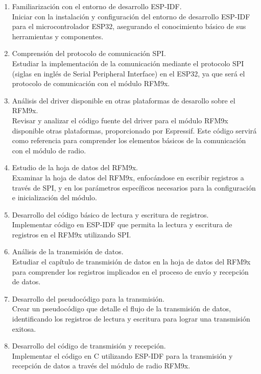 \begin{enumerate}
    \item Familiarización con el entorno de desarrollo ESP-IDF. \\
    Iniciar con la instalación y configuración del entorno de desarrollo ESP-IDF para el microcontrolador ESP32, asegurando el conocimiento básico de sus herramientas y componentes.
    \item Comprensión del protocolo de comunicación SPI. \\
    Estudiar la implementación de la comunicación mediante el protocolo SPI (siglas en inglés de Serial Peripheral Interface) en el ESP32, ya que será el protocolo de comunicación con el módulo RFM9x.
    \item Análisis del driver disponible en otras plataformas de desarollo sobre el RFM9x. \\
    Revisar y analizar el código fuente del driver para el módulo RFM9x disponible otras plataformas, proporcionado por Espressif. Este código servirá como referencia para comprender los elementos básicos de la comunicación con el módulo de radio.
    \item Estudio de la hoja de datos del RFM9x. \\
    Examinar la hoja de datos del RFM9x, enfocándose en escribir registros a través de SPI, y en los parámetros específicos necesarios para la configuración e inicialización del módulo.
    \item Desarrollo del código básico de lectura y escritura de registros. \\
    Implementar código en ESP-IDF que permita la lectura y escritura de registros en el RFM9x utilizando SPI.
    \item Análisis de la transmisión de datos. \\
    Estudiar el capítulo de transmisión de datos en la hoja de datos del RFM9x para comprender los registros implicados en el proceso de envío y recepción de datos.
    \item Desarrollo del pseudocódigo para la transmisión. \\
    Crear un pseudocódigo que detalle el flujo de la transmisión de datos, identificando los registros de lectura y escritura para lograr una transmisión exitosa.
    \item Desarrollo del código de transmisión y recepción. \\
    Implementar el código en C utilizando ESP-IDF para la transmisión y recepción de datos a través del módulo de radio RFM9x.

\end{enumerate}

